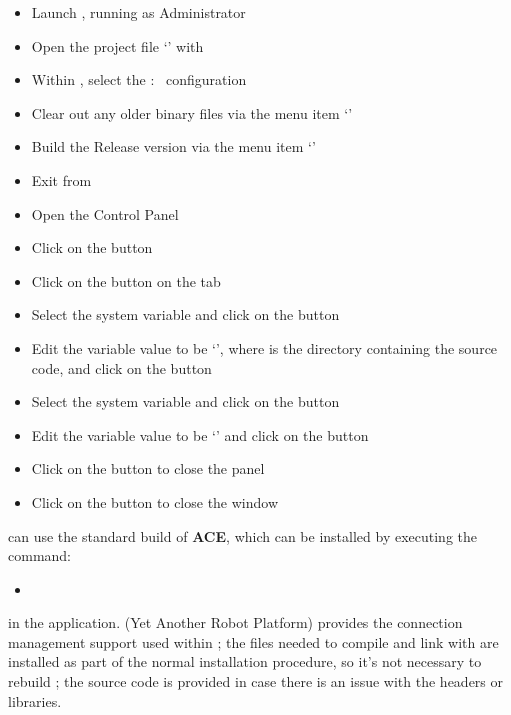 \begin{itemize}
\item Launch , running as Administrator
\item\exSp{}Open the project file
`' with 
\item\exSp{}Within , select the  :\ 
configuration
\item\exSp{}Clear out any older binary files via the menu item
`'
\item\exSp{}Build the Release version via the menu item
`'
\item\exSp{}Exit from 
\item\exSp{}Open the  Control Panel
\item\exSp{}Click on the  button
\item\exSp{}Click on the  button on the 
tab
\item\exSp{}Select the  system variable and click on the
 button 
\item\exSp{}Edit the variable value to be
`', where 
is the directory containing the \mplusm{} source code, and click on the  button
\item\exSp{}Select the  system variable and click on
the  button 
\item\exSp{}Edit the variable value to be
`' and
click on the  button
\item\exSp{}Click on the  button to close the 
panel
\item\exSp{}Click on the  button to close the 
window
\end{itemize}
\tertiaryEnd
{}
\mplusm{} can use the standard build of \textbf{ACE}, which can be installed by executing
the command:
\begin{itemize}
\item {}
\end{itemize}
in the  application.
\tertiaryEnd
\secondaryEnd
{}
\textbf{\yarp} (Yet Another Robot Platform) provides the connection management support
used within \mplusm; the files needed to compile and link with \yarp{} are installed as
part of the normal \mplusm{} installation procedure, so it's not necessary to rebuild
\yarp{}; the source code is provided in case there is an issue with the headers or
libraries.\\

